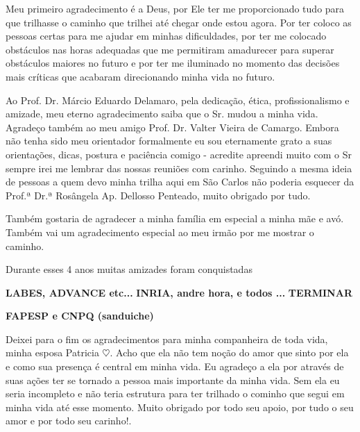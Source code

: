 

Meu primeiro agradecimento é a Deus, por Ele ter me proporcionado tudo para que trilhasse o caminho que trilhei até chegar onde estou agora. Por ter coloco as pessoas certas para me ajudar em minhas dificuldades, por ter me colocado obstáculos nas horas adequadas que me permitiram amadurecer para superar obstáculos maiores no futuro e por ter me iluminado no momento das decisões mais críticas que acabaram direcionando minha vida no futuro.

Ao Prof. Dr. Márcio Eduardo Delamaro, pela dedicação, ética, profissionalismo e amizade, meu eterno agradecimento saiba que o Sr. mudou a minha vida. Agradeço também ao meu amigo Prof. Dr. Valter Vieira de Camargo. Embora não tenha sido meu orientador formalmente eu sou eternamente grato a suas orientações, dicas, postura e paciência comigo - acredite apreendi muito com o Sr sempre irei me lembrar das nossas reuniões com carinho. Seguindo a mesma ideia de pessoas a quem devo minha trilha aqui em São Carlos não poderia esquecer da Prof.ª Dr.ª Rosângela Ap. Dellosso Penteado, muito obrigado por tudo.

Também gostaria de agradecer a minha família em especial a minha mãe e avó. Também vai um agradecimento especial ao meu irmão por me mostrar o caminho.


Durante esses 4 anos muitas amizades foram conquistadas

\textbf{LABES, ADVANCE etc...}
\textbf{INRIA, andre hora, e todos ...}
\textbf{TERMINAR}

\textbf{FAPESP e CNPQ (sanduiche)}

Deixei para o fim os agradecimentos para minha companheira de toda vida, minha esposa Patricia $\heartsuit$. Acho que ela não tem noção do amor que sinto por ela e como sua presença é central em minha vida. Eu agradeço a ela por através de suas ações ter se tornado a pessoa mais importante da minha vida. Sem ela eu seria incompleto e não teria estrutura para ter trilhado o cominho que segui em minha vida até esse momento. Muito obrigado por todo seu apoio, por tudo o seu amor e por todo seu carinho!.


